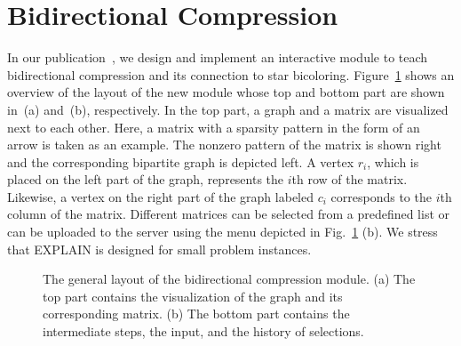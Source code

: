 \documentclass[12pt, twoside]{book}
\begin{document}
\section{Bidirectional Compression}
\label{s.bidirectional}
In our publication~\cite{2014:09}, we design and implement an interactive module to
teach bidirectional compression and its connection to star bicoloring.
Figure~\ref{f.explain} shows an overview of the layout of the new module whose top and
bottom part are shown in~(a) and~(b), respectively. In the top part, a graph and a matrix
are visualized next to each other. Here, a matrix with a sparsity pattern in the form of
an arrow is taken as an example. The nonzero pattern of the matrix is shown right and the
corresponding bipartite graph is depicted left. A vertex $r_i$, which is placed on the
left part of the graph, represents the $i$th row of the matrix. Likewise, a vertex on the
right part of the graph labeled $c_i$ corresponds to the $i$th column of the matrix.
Different matrices can be selected from a predefined list or can be uploaded to the
server using the menu depicted in Fig.~\ref{f.explain} (b). We stress that EXPLAIN is
designed for small problem instances.

\begin{figure}
\centering
{}
\hfill
{}
\caption{The general layout of the bidirectional compression module. (a) The top part
contains the visualization of the graph and its corresponding matrix. (b)
The bottom part contains the intermediate steps, the input, and the
history of selections.}
\label{f.explain}
\end{figure}
\end{document}
